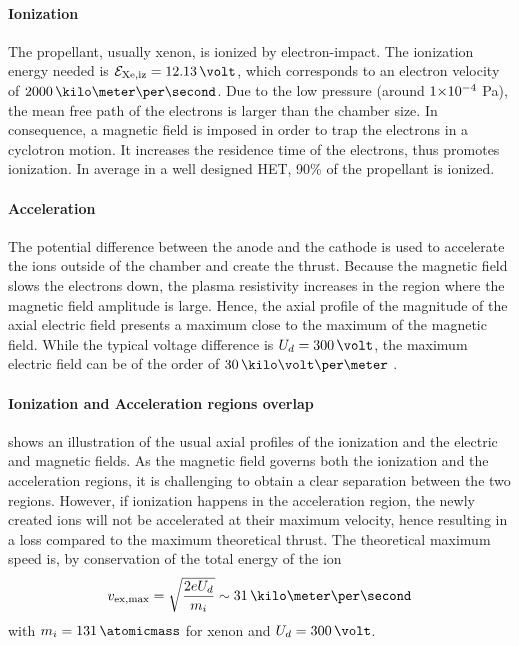   \paragraph{Ionization\\}
  The propellant, usually xenon, is ionized by electron-impact.
  The ionization energy needed is $\mathcal{E}_{\rm Xe, iz} = 12.13 \,\volt$, which corresponds to an electron velocity of $2000\,\kilo\meter\per\second$.
  Due to the low pressure (around ${{1}{\times}10^{-4}}$ Pa), the mean free path of the electrons is larger than the chamber size.
  In consequence, a magnetic field is imposed in order to trap the electrons in a cyclotron motion.
  It increases the residence time of the electrons, thus promotes  ionization.
  In average in a well designed \ac{HET}, 90\% of the propellant is ionized.

  \paragraph{Acceleration\\}
  The potential difference  between the anode and the cathode is used to accelerate the ions outside of the chamber and create the thrust.
  Because the magnetic field slows the electrons down, the plasma resistivity increases in the region where the magnetic field amplitude is large.
  Hence, the axial profile of the magnitude of the axial electric field presents a maximum close to the maximum of the magnetic field.
  While the typical voltage difference is $U_d=300\,\volt$, the maximum electric field can be of the order of $30\,\kilo\volt\per\meter$ \citep{gawron2008}.

  \paragraph{Ionization and Acceleration regions overlap\\}
   shows an illustration of the usual axial profiles of the ionization and the electric and magnetic fields.
  As the magnetic field governs both the ionization and the acceleration regions, it is challenging to obtain a clear separation between the two regions.
  However, if ionization happens in the acceleration region, the newly created ions will not be accelerated at their maximum velocity, hence resulting in a loss compared to the maximum theoretical thrust.
  The theoretical maximum speed is, by conservation of the total energy of the ion
  \begin{equation} \label{eq-vmaxtheo}
    v_{\rm ex, max} = \sqrt{ \frac{2 e U_d}{m_i} } \sim 31 \,\kilo\meter\per\second
  \end{equation}
  with $m_i = 131 \,\atomicmass$ for xenon and $U_d=300\,\volt$.

